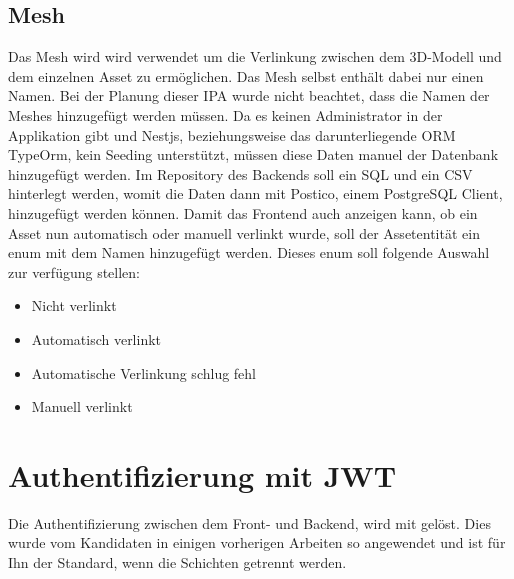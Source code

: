 \subsection{Mesh}
Das Mesh wird wird verwendet um die Verlinkung zwischen dem 3D-Modell und dem einzelnen Asset zu ermöglichen. Das Mesh selbst enthält dabei nur einen Namen. Bei der Planung dieser IPA wurde nicht beachtet, dass die Namen der Meshes hinzugefügt werden müssen. Da es keinen Administrator in der Applikation gibt und Nestjs, beziehungsweise das darunterliegende ORM TypeOrm, kein Seeding unterstützt, müssen diese Daten manuel der Datenbank hinzugefügt werden. Im Repository des Backends soll ein SQL und ein CSV hinterlegt werden, womit die Daten dann mit Postico, einem PostgreSQL Client, hinzugefügt werden können.
\newline
Damit das Frontend auch anzeigen kann, ob ein Asset nun automatisch oder manuell verlinkt wurde, soll der Assetentität ein enum mit dem Namen  hinzugefügt werden. Dieses enum soll folgende Auswahl zur verfügung stellen:
\begin{itemize}
  \item Nicht verlinkt
  \item Automatisch verlinkt
  \item Automatische Verlinkung schlug fehl
  \item Manuell verlinkt
\end{itemize}
\section{Authentifizierung mit JWT}
Die Authentifizierung zwischen dem Front- und Backend, wird mit  gelöst. Dies wurde vom Kandidaten in einigen vorherigen Arbeiten so angewendet und ist für Ihn der Standard, wenn die Schichten getrennt werden.

